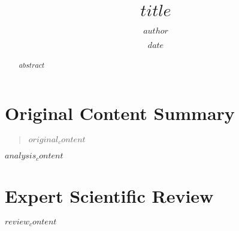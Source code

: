 \documentclass[12pt]{article}
\title{$title$}
\author{$author$}
\date{$date$}
\begin{document}
\maketitle

\begin{abstract}
$abstract$
\end{abstract}

\section{Original Content Summary}
\begin{quote}
$original_content$
\end{quote}

$analysis_content$

\section{Expert Scientific Review}
$review_content$



\end{document}
